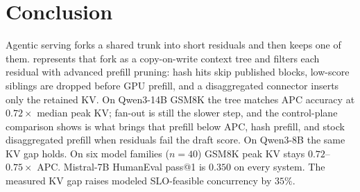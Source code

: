 \section{Conclusion}
\label{sec:conclusion}

Agentic serving forks a shared trunk into short residuals and then keeps one of them.
\sys represents that fork as a copy-on-write context tree and filters each residual with advanced prefill pruning: hash hits skip published blocks, low-score siblings are dropped before GPU prefill, and a disaggregated connector inserts only the retained KV.
On Qwen3-14B GSM8K the tree matches APC accuracy at $0.72\times$ median peak KV; fan-out is still the slower step, and the control-plane comparison shows \app is what brings that prefill below APC, hash prefill, and stock disaggregated prefill when residuals fail the draft score.
On Qwen3-8B the same KV gap holds.
On six model families ($n{=}40$) GSM8K peak KV stays $0.72$--$0.75\times$ APC.
Mistral-7B HumanEval pass@1 is $0.350$ on every system.
The measured KV gap raises modeled SLO-feasible concurrency by $35\%$.
